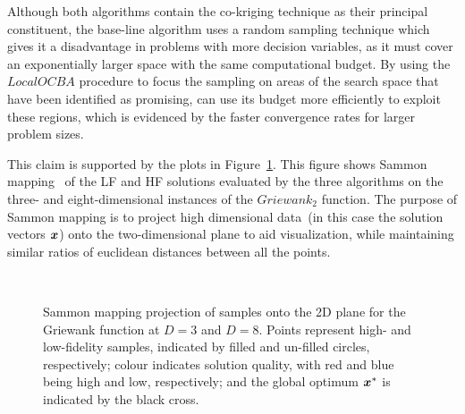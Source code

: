 Although both algorithms contain the co-kriging technique as their principal constituent, the base-line algorithm uses a random sampling technique which gives it a disadvantage in problems with more decision variables, as it must cover an exponentially larger space with the same computational budget. By using the $LocalOCBA$ procedure to focus the sampling on areas of the search space that have been identified as promising, \AlgName{} can use its budget more efficiently to exploit these regions, which is evidenced by the faster convergence rates for larger problem sizes. %

This claim is supported by the plots in Figure~\ref{fig:sammon}. This figure shows Sammon mapping~\cite{sammon1969nonlinear} of the LF and HF solutions evaluated by the three algorithms on the three- and eight-dimensional instances of the $Griewank_2$ function. The purpose of Sammon mapping is to project high dimensional data~(in this case the solution vectors $\boldsymbol{x}$) onto the two-dimensional plane to aid visualization, while maintaining similar ratios of euclidean distances between all the points. 
\begin{figure*}[h!]
  \centering
  \quad {}
  \\
  \caption{Sammon mapping projection of samples onto the 2D plane for the Griewank function at $D=3$ and $D=8$. Points represent high- and low-fidelity samples, indicated by filled and un-filled circles, respectively; colour indicates solution quality, with red and blue being high and low, respectively; and the global optimum $\boldsymbol{x}^*$ is indicated by the black cross.} 
    \label{fig:sammon}
\end{figure*}

